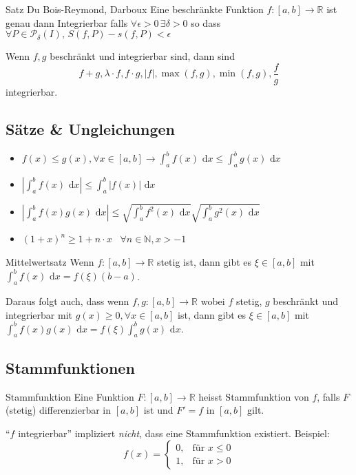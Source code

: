 \documentclass[a4paper,10pt]{article}
\def\R{\mathbb{R}}
\def\N{\mathbb{N}}
\def\dx{\text{ d}x}
\begin{document}
\begin{mainbox}{Satz Du Bois-Reymond, Darboux}
  Eine beschränkte Funktion $f: [a,b] \to \R$ ist genau dann Integrierbar falls $\forall \epsilon > 0 \, \exists \delta > 0$ so dass\\
  $\forall P \in \mathcal{P}_\delta(I), \, S(f,P) - s(f, P) < \epsilon$ 
\end{mainbox}

\begin{subbox}{}
 Wenn $f,g$ beschränkt und integrierbar sind, dann sind
 $$f+g, \lambda \cdot f, f \cdot g, |f|, \max(f,g), \min(f,g), \frac{f}{g}$$ integrierbar.
\end{subbox}

\subsection{Sätze \& Ungleichungen}
\begin{itemize}
 \item $f(x) \le g(x), \forall x \in [a,b] \rightarrow \int_a^b f(x) \dx \le \int_a^b g(x) \dx$
 \item $\left|\int_a^b f(x) \dx\right| \le \int_a^b |f(x)| \dx$
 \item $\left|\int_a^b f(x) g(x) \dx \right| \le \sqrt{\int_a^b f^2(x) \dx} \sqrt{\int_a^b g^2(x) \dx}$
 \item $(1+x)^n \geq 1+ n\cdot x$ \, $\forall n\in \N, x > -1$
\end{itemize}

\begin{mainbox}{Mittelwertsatz}
 Wenn $f: [a,b] \to \R$ stetig ist, dann gibt es $\xi \in [a,b]$ mit $\int_a^b f(x) \dx = f(\xi) (b-a)$.
\end{mainbox}
Daraus folgt auch, dass wenn $f,g: [a,b] \to \R$ wobei $f$ stetig, $g$ beschränkt und integrierbar mit $g(x) \ge 0, \forall x \in [a,b]$ ist, dann gibt es $\xi \in [a,b]$ mit $\int_a^b f(x)g(x) \dx = f(\xi) \int_a^b g(x) \dx$.

\subsection{Stammfunktionen}
\begin{subbox}{Stammfunktion}
 Eine Funktion $F: [a,b] \to \R$ heisst Stammfunktion von $f$, falls $F$ (stetig) differenzierbar in $[a,b]$ ist und $F' = f$ in $[a,b]$ gilt.
\end{subbox}
``$f$ integrierbar'' impliziert \textit{nicht}, dass eine Stammfunktion existiert. Beispiel:
$$
 f(x) = \begin{cases}
        0, & \text{für } x \le 0 \\
        1, & \text{für } x > 0
        \end{cases}
$$
\end{document}

